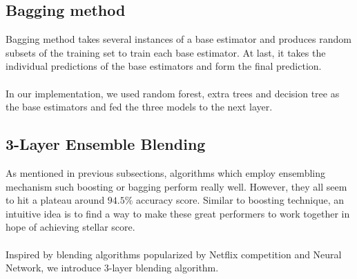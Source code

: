 \documentclass[conference]{IEEEtran}
\begin{document}
\subsection{Bagging method}
Bagging method takes several instances of a base estimator and produces random subsets of the training set to train each base estimator. At last, it takes the individual predictions of the base estimators and form the final prediction. \\ \\
In our implementation, we used random forest, extra trees and decision tree as the base estimators and fed the three models to the next layer.  

\subsection{3-Layer Ensemble Blending}
As mentioned in previous subsections, algorithms which employ ensembling mechanism such boosting or bagging perform really well. However, they all seem to hit a plateau around $94.5\%$ accuracy score. Similar to boosting technique, an intuitive idea is to find a way to make these great performers to work together in hope of achieving stellar score. \\ \\
Inspired by blending algorithms popularized by Netflix competition and Neural Network, we introduce 3-layer blending algorithm.
\\
\end{document}
